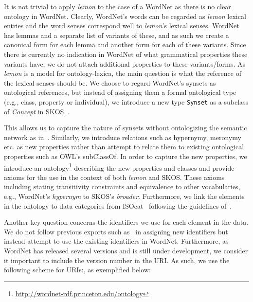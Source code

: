 \documentclass[10pt, a4paper]{article}
\newcommand{\lemon}[0]{\emph{lemon}}
\begin{document}
It is not trivial to apply \lemon{} to the case of a WordNet as there is no
clear ontology in WordNet.
Clearly, WordNet's 
words can be regarded as \lemon{} lexical entries and the word senses correspond
well to \lemon{}'s lexical senses. WordNet has lemmas and a separate list of
variants of these, and as such we create a canonical form for each lemma and another 
form for each of these variants. Since there is currently no indication in
WordNet of what grammatical properties these variants have, we do not attach additional properties to these variants/forms. As \lemon{} is a model for
ontology-lexica, the main question is what the reference of the lexical senses should be.
We choose to regard WordNet's synsets as ontological references, but instead of assigning them a formal ontological type (e.g.,
class, property or individual), we introduce a new type {\tt Synset} as a subclass of \emph{Concept} in SKOS~\cite{miles2007skos}.

This allows us to capture the nature of synsets without
ontologizing the semantic network as in~\cite{gangemi2003ontowordnet}.
Similarly, we introduce relations such as hypernymy, meronymy etc. as new
properties rather than attempt to relate them to existing ontological
properties such as OWL's subClassOf. In order to capture the new properties, we
introduce an ontology\footnote{\url{http://wordnet-rdf.princeton.edu/ontology}}
describing the new properties and classes and provide
axioms for the use in the context of both \lemon{} and SKOS. These axioms including
stating transitivity constraints and equivalence to other vocabularies, e.g., WordNet's 
\emph{hypernym} to SKOS's \emph{broader}.
Furthermore, we
link the elements in the ontology to data categories from
ISOcat~\cite{kemps2008isocat} following the guidelines
of~\cite{windhouwer2012linking}.

Another key question concerns the identifiers we use for each element in the data.
We do not follow previous exports such as~\cite{van2006conversion} in assigning new identifiers
but instead attempt to use the existing identifiers in WordNet. Furthermore, as
WordNet has released several versions and is still under development, we consider it 
important to include the version number in the URI. As such, we use the
following scheme for URIs:, as exemplified below:
\end{document}
